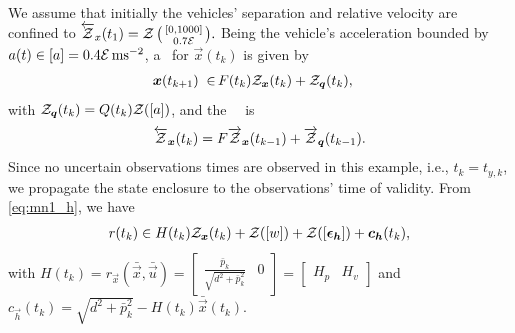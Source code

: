 \documentclass{ifacconf}
\begin{document}
We assume that initially the vehicles' separation and relative  velocity are confined to
${\overleftarrow{\mathcal{Z}}_x(t_1) = \mathcal{Z}\left(\begin{smallmatrix}
[0, 1000]\\
0.7\mathcal{E}
\end{smallmatrix}\right)}.$
Being the vehicle's acceleration bounded by ${a(t) \in [a] = 0.4\mathcal{E} \,\mathrm{m}\mathrm{s}^{-2}}$, a \linearinclusion\ for $\vec{x}(t_{k})$ is given by
\begin{align}
\boldsymbol{x}(t_{k+1})
\; \in \, &
F (t_{k})
\mathcal{Z}_{\boldsymbol{x}}(t_{k})
+
\mathcal{Z}_{\boldsymbol{q}}(t_{k}),
\label{eq:mn1_f}
\end{align}
with $\mathcal{Z}_{\boldsymbol{q}}(t_{k}) = Q(t_k)\mathcal{Z}([a]) $,
and the \apriori\ \cz\ is
\begin{equation}
\overleftarrow{\mathcal{Z}}_{\boldsymbol{x}}(t_k) =
F
\overrightarrow{\mathcal{Z}}_{\boldsymbol{x}} (t_{k-1})
+
\overrightarrow{\mathcal{Z}}_{\boldsymbol{q}}(t_{k-1}).
\label{eq:mn1_propagation}
\end{equation}
Since no uncertain observations times are observed in this example, i.e., ${t_k = t_{y,k}}$, we propagate the state enclosure to the observations' time of validity. From \eqref{eq:mn1_h}, we have
\begin{align}
{r}(t_k) \in
H(t_k)
\mathcal{Z}_{\boldsymbol{x}}(t_k)
+ \mathcal{Z}([{w}] )
+ \mathcal{Z}([\boldsymbol{\epsilon}_{\boldsymbol{h}}] )
+ \boldsymbol{c}_{\boldsymbol{h}}(t_k),
\end{align}
with
${H(t_k)
=
r_{\vec{x}}(\bar{\vec{x}},\bar{\vec{u}})
=
\left[\begin{smallmatrix}
\frac{\bar{p}_k}{\sqrt{d^2 + \bar{p}^2_k}} & 0
\end{smallmatrix}\right]
=
\begin{bmatrix}
H_p & H_v
\end{bmatrix}}$
and\\
${c_{\vec{h}}(t_k) =
 \sqrt{
	d^2 + \bar{p}_k^2
}
-
H(t_k)
\bar{\vec{x}}(t_k)}$.
\end{document}
